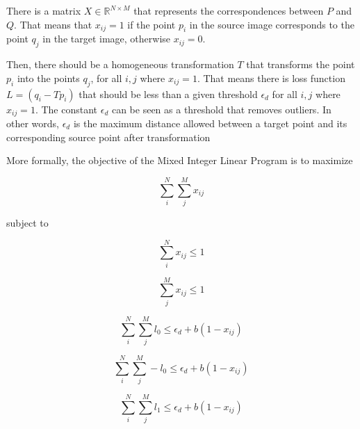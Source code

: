         There is a matrix $X \in \mathbb{R}^{N \times M}$ that represents the correspondences between $P$ and $Q$.
        That means that $x_{ij} = 1$ if the point $p_i$ in the source image corresponds to the point $q_j$ in the target image, otherwise $x_{ij} = 0$.

        Then, there should be a homogeneous transformation $T$ that transforms the point $p_i$ into the points $q_j$, for all $i, j$ where $x_{ij} = 1$.
        That means there is loss function $L = (q_i - T p_i)$ that should be less than a given threshold $\epsilon_d$
        for all $i, j$ where $x_{ij} = 1$. The constant $\epsilon_d$ can be seen as a threshold that removes outliers.
        In other words, $\epsilon_d$ is the maximum distance allowed between a target point and its corresponding source point after transformation

        More formally, the objective of the Mixed Integer Linear Program is to maximize
        
        \begin{equation}
            \label{eq:objective_original}
            \sum_{i}^{N} \sum_{j}^{M} x_{ij}    
        \end{equation}
        
        subject to
        
        \begin{equation}
            \label{eq:subject_sum_rows}
            \sum_{i}^{N} x_{ij} \leq 1
        \end{equation}
        
        \begin{equation}
            \label{eq:subject_sum_columns}
            \sum_{j}^{M} x_{ij} \leq 1
        \end{equation}

        \begin{equation}
            \label{eq:subject_transformation_0}
            \sum_{i}^{N} \sum_{j}^{M} l_{0} \leq \epsilon_d + b (1 - x_{ij})
        \end{equation}

        \begin{equation}
            \label{eq:subject_transformation_negative_0}
            \sum_{i}^{N} \sum_{j}^{M} -l_{0} \leq \epsilon_d + b (1 - x_{ij})
        \end{equation}

        \begin{equation}
            \label{eq:subject_transformation_1}
            \sum_{i}^{N} \sum_{j}^{M} l_{1} \leq \epsilon_d + b (1 - x_{ij})
        \end{equation}

